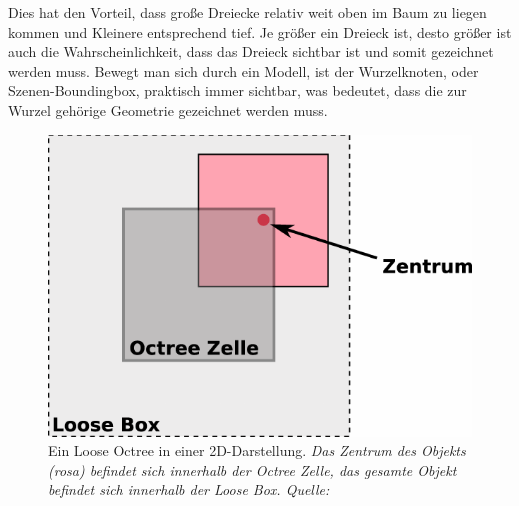 Dies hat den Vorteil, dass große Dreiecke relativ weit oben im Baum zu liegen kommen und Kleinere entsprechend tief. Je größer ein Dreieck ist, desto größer ist auch die Wahrscheinlichkeit, dass das Dreieck sichtbar ist und somit gezeichnet werden muss. Bewegt man sich durch ein Modell, ist der Wurzelknoten, oder Szenen-Boundingbox, praktisch immer sichtbar, was bedeutet, dass die zur Wurzel gehörige Geometrie gezeichnet werden muss.
\begin{figure}
 \centering
  \includegraphics[scale=0.8]{images/looseoctree2.pdf}
  \caption{Ein Loose Octree in einer 2D-Darstellung. \textit{Das Zentrum des Objekts (rosa) befindet sich innerhalb der Octree Zelle, das gesamte Objekt befindet sich innerhalb der Loose Box. Quelle: }}
 \label{fig:basics:looseoctree}
\end{figure}

